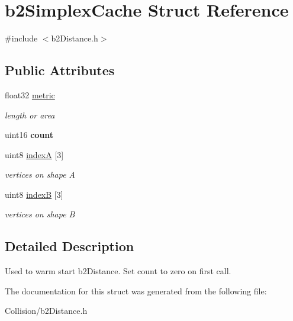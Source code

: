 \hypertarget{structb2SimplexCache}{}\section{b2\+Simplex\+Cache Struct Reference}
\label{structb2SimplexCache}


{\ttfamily \#include $<$b2\+Distance.\+h$>$}

\subsection*{Public Attributes}
\begin{DoxyCompactItemize}
\item 
\mbox{\label{structb2SimplexCache_a018e0a500b417d79bfed3f21310b15a2}} 
float32 \mbox{\hyperlink{structb2SimplexCache_a018e0a500b417d79bfed3f21310b15a2}{metric}}
\begin{DoxyCompactList}\small\item\em length or area \end{DoxyCompactList}\item 
\mbox{\label{structb2SimplexCache_a5ef63839988cc06210ae76bcef96f56c}} 
uint16 {\bfseries count}
\item 
\mbox{\label{structb2SimplexCache_ab574159e69dda7e14ead8de848ca6b67}} 
uint8 \mbox{\hyperlink{structb2SimplexCache_ab574159e69dda7e14ead8de848ca6b67}{indexA}} \mbox{[}3\mbox{]}
\begin{DoxyCompactList}\small\item\em vertices on shape A \end{DoxyCompactList}\item 
\mbox{\label{structb2SimplexCache_ab7586465ee2c5f7c3bdd8f80d5e256a7}} 
uint8 \mbox{\hyperlink{structb2SimplexCache_ab7586465ee2c5f7c3bdd8f80d5e256a7}{indexB}} \mbox{[}3\mbox{]}
\begin{DoxyCompactList}\small\item\em vertices on shape B \end{DoxyCompactList}\end{DoxyCompactItemize}


\subsection{Detailed Description}
Used to warm start b2\+Distance. Set count to zero on first call. 

The documentation for this struct was generated from the following file\+:\begin{DoxyCompactItemize}
\item 
Collision/b2\+Distance.\+h\end{DoxyCompactItemize}
